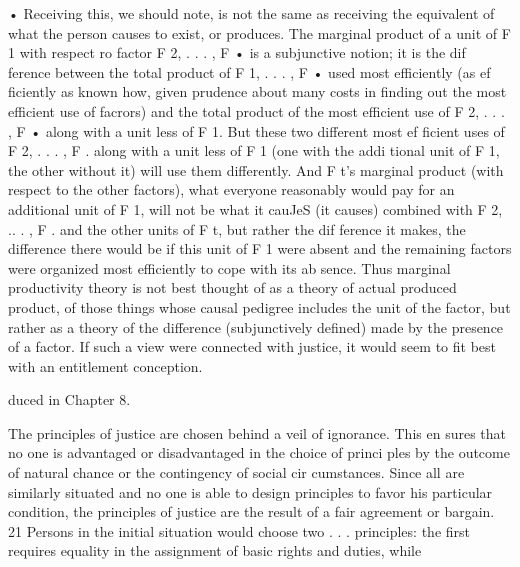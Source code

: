 \documentclass[11pt,openany]{book}
\begin{document}
{• Receiving this, we should note, is not the same as receiving the equivalent of what the person causes to exist, or produces. The marginal product of a unit of F 1 with respect ro factor F 2, . . . , F • is a subjunctive notion; it is the dif ference between the total product of F 1, . . . , F • used most efficiently (as ef ficiently as known how, given prudence about many costs in finding out the most efficient use of facrors) and the total product of the most efficient use of F 2, . . . , F • along with a unit less of F 1. But these two different most ef ficient uses of F 2, . . . , F . along with a unit less of F 1 (one with the addi tional unit of F 1, the other without it) will use them differently. And F t's marginal product (with respect to the other factors), what everyone reasonably would pay for an additional unit of F 1, will not be what it cauJeS (it causes) combined with F 2, .. . , F . and the other units of F t, but rather the dif ference it makes, the difference there would be if this unit of F 1 were absent and the remaining factors were organized most efficiently to cope with its ab sence. Thus marginal productivity theory is not best thought of as a theory of actual produced product, of those things whose causal pedigree includes the unit of the factor, but rather as a theory of the difference (subjunctively defined) made by the presence of a factor. If such a view were connected with justice, it would seem to fit best with an entitlement conception.\par

duced in Chapter 8.\par

The principles of justice are chosen behind a veil of ignorance. This en sures that no one is advantaged or disadvantaged in the choice of princi ples by the outcome of natural chance or the contingency of social cir cumstances. Since all are similarly situated and no one is able to design principles to favor his particular condition, the principles of justice are the result of a fair agreement or bargain. 21 Persons in the initial situation would choose two . . . principles: the first requires equality in the assignment of basic rights and duties, while\par

}
\end{document}
